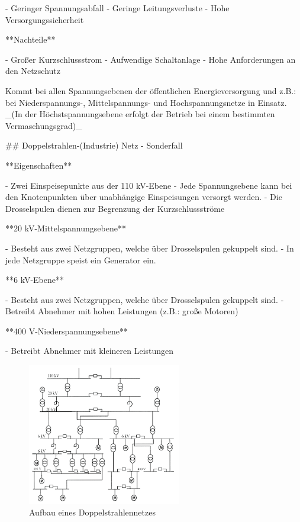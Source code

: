 \begin{markdown}
- Geringer Spannungsabfall
- Geringe Leitungsverluste
- Hohe Versorgungssicherheit

**Nachteile**

- Großer Kurzschlussstrom
- Aufwendige Schaltanlage
- Hohe Anforderungen an den Netzschutz

Kommt bei allen Spannungsebenen der öffentlichen Energieversorgung und z.B.: bei Niederspannungs-, Mittelspannungs- und Hochspannungsnetze in Einsatz. _(In der Höchstspannungsebene erfolgt der Betrieb bei einem bestimmten Vermaschungsgrad)_

\newpage

## Doppelstrahlen-(Industrie) Netz - Sonderfall

**Eigenschaften**

- Zwei Einspeisepunkte aus der 110 kV-Ebene
- Jede Spannungsebene kann bei den Knotenpunkten über unabhängige Einspeisungen versorgt werden.
- Die Drosselspulen dienen zur Begrenzung der Kurzschlussströme

**20 kV-Mittelspannungsebene**

- Besteht aus zwei Netzgruppen, welche über Drosselspulen gekuppelt sind.
- In jede Netzgruppe speist ein Generator ein.

**6 kV-Ebene**

- Besteht aus zwei Netzgruppen, welche über Drosselspulen gekuppelt sind.
- Betreibt Abnehmer mit hohen Leistungen (z.B.: große Motoren)

**400 V-Niederspannungsebene**

- Betreibt Abnehmer mit kleineren Leistungen

\begin{figure}[H]
    \centering
    \includegraphics[width=0.6\textwidth]{./images/01-Netze/Doppelstrahlennetz.png}
    \caption[Aufbau eines Doppelstrahlennetzes]{Aufbau eines Doppelstrahlennetzes}
\end{figure}


\end{markdown}
